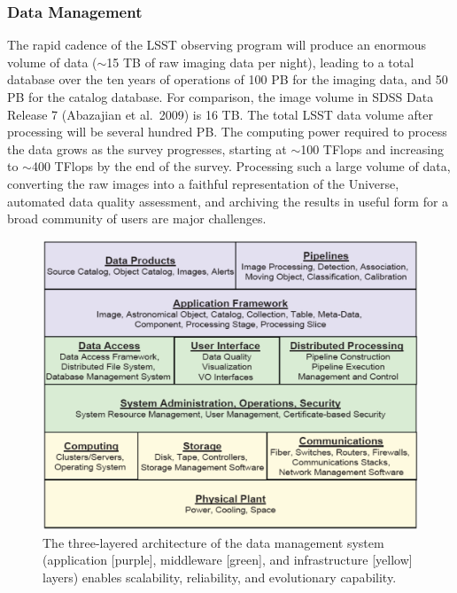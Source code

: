 \documentclass{emulateapj}
\begin{document}
\vskip 0.2in
\subsubsection{ Data Management }


The rapid cadence of the LSST observing program will produce an enormous
volume of data ($\sim$15 TB of raw imaging data per night), leading to a total database over 
the ten years of operations of 100 PB for the imaging data, and 50 PB for the catalog database. 
For comparison, the image volume in SDSS Data Release 7 (Abazajian et
al.~2009) is 16 TB. 
The total LSST data volume after processing will be several hundred PB.
The computing power required to process the data grows as the survey
progresses, starting at
 $\sim$100 TFlops and increasing to $\sim$400 TFlops by the end of the survey. Processing 
such a large volume of data, converting the raw images into a faithful
representation of the Universe, automated data quality assessment, and 
archiving the results in useful form for a broad community of users are
major challenges.

\begin{figure}
\vskip 0.1in
\includegraphics[width=1.0\hsize,clip]{DMsandwich.pdf}
\caption{The three-layered architecture of the data management system 
(application [purple], middleware [green], and infrastructure [yellow] layers) 
enables scalability, reliability, and evolutionary capability.} 
\label{Fig:DM1}
\end{figure}
\end{document}
